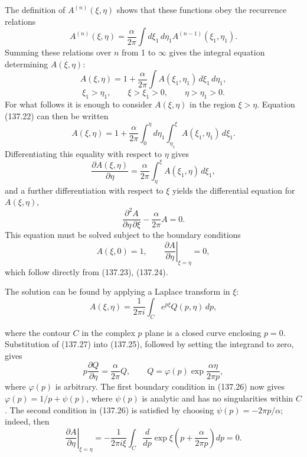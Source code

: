 The definition of $A^{(n)}(\xi,\eta)$ shows that these functions obey the recurrence relations
\[
A^{(n)}(\xi,\eta)=\frac{\alpha}{2\pi}\int d\xi_1\,d\eta_1
A^{(n-1)}(\xi_1,\eta_1).
\]
Summing these relations over $n$ from 1 to $\infty$ gives the integral equation determining $A(\xi,\eta)$:
\begin{equation}
A(\xi,\eta)=1+\frac{\alpha}{2\pi}\int A(\xi_1,\eta_1)\,d\xi_1\,d\eta_1,
\tag{137.22}
\end{equation}
\[
\xi_1>\eta_1,\qquad \xi>\xi_1>0,\qquad \eta>\eta_1>0.
\]
For what follows it is enough to consider $A(\xi,\eta)$ in the region $\xi>\eta$. Equation (137.22) can then be written
\begin{equation}
A(\xi,\eta)=1+\frac{\alpha}{2\pi}
\int_0^\eta\!d\eta_1\int_{\eta_1}^\xi\!A(\xi_1,\eta_1)\,d\xi_1.
\tag{137.23}
\end{equation}
Differentiating this equality with respect to $\eta$ gives
\begin{equation}
\frac{\partial A(\xi,\eta)}{\partial\eta}
=\frac{\alpha}{2\pi}\int_\eta^\xi A(\xi_1,\eta)\,d\xi_1,
\tag{137.24}
\end{equation}
and a further differentiation with respect to $\xi$ yields the differential equation for $A(\xi,\eta)$,
\begin{equation}
\frac{\partial^2A}{\partial\eta\,\partial\xi}-\frac{\alpha}{2\pi}A=0.
\tag{137.25}
\end{equation}
This equation must be solved subject to the boundary conditions
\begin{equation}
A(\xi,0)=1,\qquad
\left.\frac{\partial A}{\partial\eta}\right|_{\xi=\eta}=0,
\tag{137.26}
\end{equation}
which follow directly from (137.23), (137.24).

The solution can be found by applying a Laplace transform in $\xi$:
\begin{equation}
A(\xi,\eta)=\frac{1}{2\pi i}\int_C e^{p\xi}Q(p,\eta)\,dp,
\tag{137.27}
\end{equation}

where the contour $C$ in the complex $p$ plane is a closed curve enclosing $p=0$. Substitution of (137.27) into (137.25), followed by setting the integrand to zero, gives
\[
p\frac{\partial Q}{\partial\eta}=\frac{\alpha}{2\pi}Q,
\qquad Q=\varphi(p)\exp\frac{\alpha\eta}{2\pi p},
\]
where $\varphi(p)$ is arbitrary. The first boundary condition in (137.26) now gives $\varphi(p)=1/p+\psi(p)$, where $\psi(p)$ is analytic and has no singularities within $C$. The second condition in (137.26) is satisfied by choosing $\psi(p)=-2\pi p/\alpha$; indeed, then
\[
\left.\frac{\partial A}{\partial\eta}\right|_{\xi=\eta}
=-\frac{1}{2\pi i\xi}\int_C\frac{d}{dp}
\exp\xi\left(p+\frac{\alpha}{2\pi p}\right)dp=0.
\]


